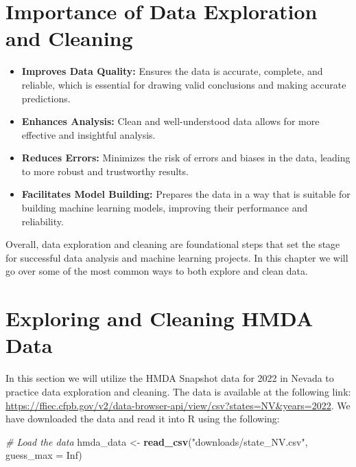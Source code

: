 \documentclass[
]{book}
\newenvironment{Shaded}{\begin{snugshade}}{\end{snugshade}}
\newcommand{\AttributeTok}[1]{\textcolor[rgb]{0.13,0.29,0.53}{#1}}
\newcommand{\CommentTok}[1]{\textcolor[rgb]{0.56,0.35,0.01}{\textit{#1}}}
\newcommand{\ConstantTok}[1]{\textcolor[rgb]{0.56,0.35,0.01}{#1}}
\newcommand{\FunctionTok}[1]{\textcolor[rgb]{0.13,0.29,0.53}{\textbf{#1}}}
\newcommand{\NormalTok}[1]{#1}
\newcommand{\OtherTok}[1]{\textcolor[rgb]{0.56,0.35,0.01}{#1}}
\newcommand{\StringTok}[1]{\textcolor[rgb]{0.31,0.60,0.02}{#1}}
\providecommand{\tightlist}{%
  \setlength{\itemsep}{0pt}\setlength{\parskip}{0pt}}
\begin{document}
\hypertarget{importance-of-data-exploration-and-cleaning}{%
\section*{Importance of Data Exploration and Cleaning}\label{importance-of-data-exploration-and-cleaning}}

\begin{itemize}
\tightlist
\item
  \textbf{Improves Data Quality:} Ensures the data is accurate, complete, and reliable, which is essential for drawing valid conclusions and making accurate predictions.
\item
  \textbf{Enhances Analysis:} Clean and well-understood data allows for more effective and insightful analysis.
\item
  \textbf{Reduces Errors:} Minimizes the risk of errors and biases in the data, leading to more robust and trustworthy results.
\item
  \textbf{Facilitates Model Building:} Prepares the data in a way that is suitable for building machine learning models, improving their performance and reliability.
\end{itemize}

Overall, data exploration and cleaning are foundational steps that set the stage for successful data analysis and machine learning projects. In this chapter we will go over some of the most common ways to both explore and clean data.

\hypertarget{exploring-and-cleaning-hmda-data}{%
\section{Exploring and Cleaning HMDA Data}\label{exploring-and-cleaning-hmda-data}}

In this section we will utilize the HMDA Snapshot data for 2022 in Nevada to practice data exploration and cleaning. The data is available at the following link: \url{https://ffiec.cfpb.gov/v2/data-browser-api/view/csv?states=NV\&years=2022}. We have downloaded the data and read it into R using the following:

\begin{Shaded}
\begin{Highlighting}[]
\CommentTok{\# Load the data}
\NormalTok{hmda\_data }\OtherTok{\textless{}{-}} \FunctionTok{read\_csv}\NormalTok{(}\StringTok{"downloads/state\_NV.csv"}\NormalTok{, }\AttributeTok{guess\_max =} \ConstantTok{Inf}\NormalTok{)}
\end{Highlighting}
\end{Shaded}
\end{document}
